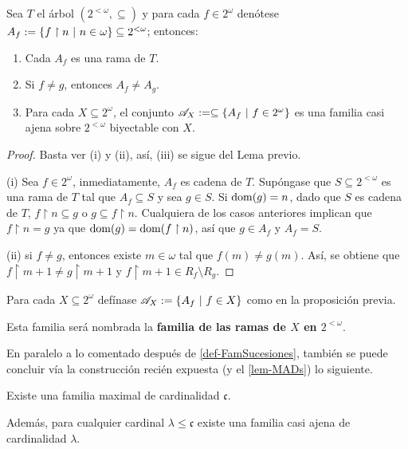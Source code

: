 	\begin{proposicion}
		Sea $T$ el árbol $(2^{<\omega},\subseteq)$ y para cada $f \in 2^\omega$ denótese $A_f:=\{ f \upharpoonright n \text{ $|$ } n \in \omega \} \subseteq 2^{<\omega}$; entonces:
		\begin{enumerate}
			\item Cada $A_f$ es una rama de $T$.
			\item Si $f\neq g$, entonces $A_f \neq A_g$.
			\item Para cada $X \subseteq 2^\omega$, el conjunto $\mathscr{A}_X := \subseteq \{A_f \text{ $|$ } f \in 2^\omega\}$ es una familia casi ajena sobre $2^{<\omega}$ biyectable con $X$.
		\end{enumerate}
	\end{proposicion}
	\begin{proof}
		Basta ver (i) y (ii), así, (iii) se sigue del Lema previo.

		(i) Sea $f \in 2^\omega$, inmediatamente, $A_f$ es cadena de $T$. Supóngase que $S \subseteq 2^{<\omega}$ es una rama de $T$ tal que $A_f \subseteq S$ y sea $g \in S$. Si $\operatorname{dom}(g)=n$, dado que $S$ es cadena de $T$, $f \upharpoonright n \subseteq g$ o $g \subseteq f \upharpoonright n$. Cualquiera de los casos anteriores implican que $f \upharpoonright n = g$ ya que $\operatorname{dom}(g)=\operatorname{dom}(f \upharpoonright n)$, así que $g \in A_f$ y $A_f = S$.

		(ii) si $f \neq g$, entonces existe $m\in \omega$ tal que $f(m) \neq g(m)$. Así, se obtiene que $f \upharpoonright m+1 \neq g \upharpoonright m+1$ y $f \upharpoonright m+1 \in R_f \setminus R_g$.
	\end{proof}

	\begin{definicion}\label{def-FamRamas}
		Para cada $X \subseteq 2^\omega$ defínase $\mathscr{A}_X:=\{A_f \text{ $|$ } f \in X\}$ como en la proposición previa.
		
		Esta familia será nombrada la \textbf{familia de las ramas de $X$ en $2^{<\omega}$}.
	\end{definicion}

	En paralelo a lo comentado después de \ref{def-FamSucesiones}, también se puede concluir vía la construcción recién expuesta (y el \autoref{lem-MADs}) lo siguiente.

	\begin{corolario}\label{cor-famGrandes}
		Existe una familia maximal de cardinalidad $\mathfrak{c}$.
		
		Además, para cualquier cardinal $\lambda \leq \mathfrak{c}$ existe una familia casi ajena de cardinalidad $\lambda$.
	\end{corolario}

